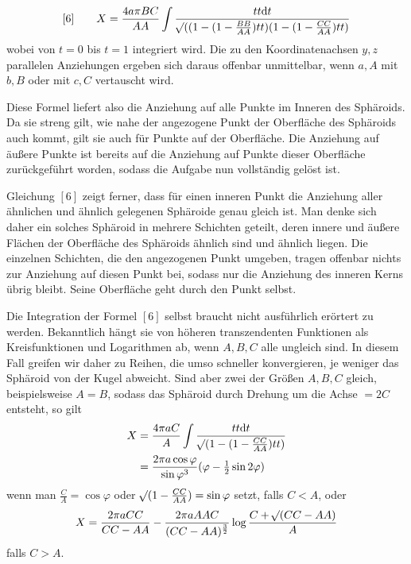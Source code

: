\[
[6]\qquad X=\frac{4a\pi BC}{AA}\int\frac{tt\mathrm{d}t}{\mathord{{}^{}\!\surd}((1-(1-\frac{BB}{AA})tt)(1-(1-\frac{CC}{AA})tt)}
\]
wobei von $t=0$ bis $t=1$ integriert wird. Die zu den Koordinatenachsen $y,z$ parallelen Anziehungen ergeben sich daraus offenbar unmittelbar, wenn $a,A$ mit $b,B$ oder mit $c,C$ vertauscht wird.

Diese Formel liefert also die Anziehung auf alle Punkte im Inneren des Sphäroids. Da sie streng gilt, wie nahe der angezogene Punkt der Oberfläche des Sphäroids auch kommt, gilt sie auch für Punkte auf der Oberfläche. Die Anziehung auf äußere Punkte ist bereits auf die Anziehung auf Punkte dieser Oberfläche zurückgeführt worden, sodass die Aufgabe nun vollständig gelöst ist.

Gleichung $[6]$ zeigt ferner, dass für einen inneren Punkt die Anziehung aller ähnlichen und ähnlich gelegenen Sphäroide genau gleich ist. Man denke sich daher ein solches Sphäroid in mehrere Schichten geteilt, deren innere und äußere Flächen der Oberfläche des Sphäroids ähnlich sind und ähnlich liegen. Die einzelnen Schichten, die den angezogenen Punkt umgeben, tragen offenbar nichts zur Anziehung auf diesen Punkt bei, sodass nur die Anziehung des inneren Kerns übrig bleibt. Seine Oberfläche geht durch den Punkt selbst.

\par
Die Integration der Formel $[6]$ selbst braucht nicht ausführlich erörtert zu werden. Bekanntlich hängt sie von höheren transzendenten Funktionen als Kreisfunktionen und Logarithmen ab, wenn $A,B,C$ alle ungleich sind. In diesem Fall greifen wir daher zu Reihen, die umso schneller konvergieren, je weniger das Sphäroid von der Kugel abweicht. Sind aber zwei der Größen $A,B,C$ gleich, beispielsweise $A=B$, sodass das Sphäroid durch Drehung um die Achse $=2C$ entsteht, so gilt
\[
\begin{aligned}
X&=\frac{4\pi aC}{A}\int\frac{tt\mathrm{d}t}{\mathord{{}^{}\!\surd}(1-(1-\frac{CC}{AA})tt)}\\
&=\frac{2\pi a\cos\varphi}{\sin\varphi^3}(\varphi-\tfrac12\sin2\varphi)
\end{aligned}
\]
wenn man $\frac{C}{A}=\cos\varphi$ oder $\mathord{{}^{}\!\surd}(1-\frac{CC}{AA})=\sin\varphi$ setzt, falls $C<A$, oder
\[
X=\frac{2\pi aCC}{CC-AA}-\frac{2\pi aAAC}{(CC-AA)^{\frac32}}\log\frac{C+\mathord{{}^{}\!\surd}(CC-AA)}{A}
\]
falls $C>A$.
